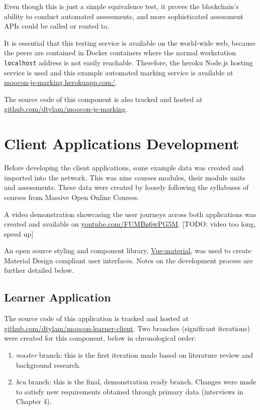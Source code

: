 Even though this is just a simple equivalence test, it proves the blockchain's ability to conduct automated assessments, 
and more sophisticated assessment APIs could be called or routed to.

It is essential that this testing service is available on the world-wide web, because the peers are contained in Docker
containers where the normal workstation \texttt{localhost} address is not easily reachable. Therefore, the heroku Node.js 
hosting service is used and this example automated marking service is available at 
\href{https://moocon-js-marking.herokuapp.com/}{\underline{moocon-js-marking.herokuapp.com/}}.

The source code of this component is also tracked and hosted at 
\href{https://github.com/dtylam/moocon-js-marking}{\underline{github.com/dtylam/moocon-js-marking}}.

\section{Client Applications Development}

Before developing the client applications, some example data was created and imported into the network. 
This was nine courses modules, their module units and assessments. These data were created by loosely following 
the syllabuses of courses from Massive Open Online Courses.

A video demonstration showcasing the user journeys across both applications was created and 
available on \href{https://youtu.be/FUMBn6wPG5M}{\underline{youtube.com/FUMBn6wPG5M}}. [TODO: video too long, speed up]

An open source styling and component library, \href{https://vuematerial.io/}{Vue-material}, was used to 
create Material Design compliant user interfaces. Notes on the development process are further detailed below.

\subsection{Learner Application}

The source code of this application is tracked and hosted at 
\href{https://github.com/dtylam/moocon-learner-client}{\underline{github.com/dtylam/moocon-learner-client}}.
Two branches (significant iterations) were created for this component, below in chronological order:
\begin{enumerate}
	\setlength\itemsep{0em}
	\item \textit{master} branch: this is the first iteration made based on literature review and background research.
	\item \textit{bcu} branch: this is the final, demonstration ready branch. 
	Changes were made to satisfy new requirements obtained through primary data (interviews in Chapter 4).
\end{enumerate}

